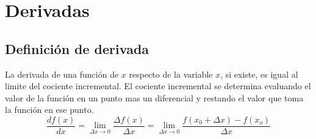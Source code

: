 \chapter{Derivadas}
\section{Definición de derivada}
La derivada de una función de $x$ respecto de la variable $x$, si existe,  es igual al limite del cociente incremental. El cociente incremental se determina evaluando el valor de la función en un punto mas un diferencial y restando el valor que toma la función en ese punto.
\begin{equation*}
	\frac{df(x)}{dx}=\lim_{\Delta x \rightarrow 0}\frac{\Delta f(x)}{\Delta x}=\lim_{\Delta x \rightarrow 0}\frac{f(x_0 +\Delta x)-f(x_o)}{\Delta x}
\end{equation*}
